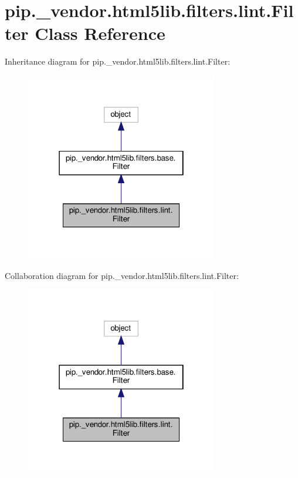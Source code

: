 \hypertarget{classpip_1_1__vendor_1_1html5lib_1_1filters_1_1lint_1_1Filter}{}\section{pip.\+\_\+vendor.\+html5lib.\+filters.\+lint.\+Filter Class Reference}
\label{classpip_1_1__vendor_1_1html5lib_1_1filters_1_1lint_1_1Filter}


Inheritance diagram for pip.\+\_\+vendor.\+html5lib.\+filters.\+lint.\+Filter\+:
\nopagebreak
\begin{figure}[H]
\begin{center}
\leavevmode
\includegraphics[width=238pt]{classpip_1_1__vendor_1_1html5lib_1_1filters_1_1lint_1_1Filter__inherit__graph}
\end{center}
\end{figure}


Collaboration diagram for pip.\+\_\+vendor.\+html5lib.\+filters.\+lint.\+Filter\+:
\nopagebreak
\begin{figure}[H]
\begin{center}
\leavevmode
\includegraphics[width=238pt]{classpip_1_1__vendor_1_1html5lib_1_1filters_1_1lint_1_1Filter__coll__graph}
\end{center}
\end{figure}
